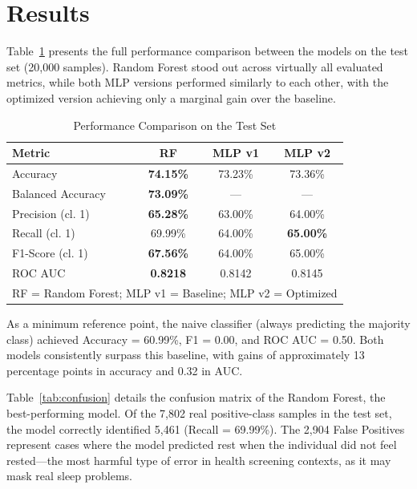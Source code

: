 \documentclass[conference]{IEEEtran}
\begin{document}
\section{Results}

Table~\ref{tab:results_main} presents the full performance comparison between the models on the test set (20,000 samples). Random Forest stood out across virtually all evaluated metrics, while both MLP versions performed similarly to each other, with the optimized version achieving only a marginal gain over the baseline.

\begin{table}[!ht]
\caption{Performance Comparison on the Test Set}
\label{tab:results_main}
\centering
\renewcommand{\arraystretch}{1.3}
\begin{tabular}{lccc}
\toprule
\textbf{Metric} & \textbf{RF} & \textbf{MLP v1} & \textbf{MLP v2} \\
\midrule
Accuracy            & \textbf{74.15\%} & 73.23\% & 73.36\% \\
Balanced Accuracy   & \textbf{73.09\%} & ---     & ---     \\
Precision (cl. 1)   & \textbf{65.28\%} & 63.00\% & 64.00\% \\
Recall (cl. 1)      & 69.99\%          & 64.00\% & \textbf{65.00\%} \\
F1-Score (cl. 1)    & \textbf{67.56\%} & 64.00\% & 65.00\% \\
ROC AUC             & \textbf{0.8218}  & 0.8142  & 0.8145  \\
\bottomrule
\multicolumn{4}{l}{\footnotesize RF = Random Forest; MLP v1 = Baseline; MLP v2 = Optimized} \\
\end{tabular}
\end{table}

As a minimum reference point, the naive classifier (always predicting the majority class) achieved Accuracy = 60.99\%, F1 = 0.00, and ROC AUC = 0.50. Both models consistently surpass this baseline, with gains of approximately 13 percentage points in accuracy and 0.32 in AUC.

Table~\ref{tab:confusion} details the confusion matrix of the Random Forest, the best-performing model. Of the 7,802 real positive-class samples in the test set, the model correctly identified 5,461 (Recall = 69.99\%). The 2,904 False Positives represent cases where the model predicted rest when the individual did not feel rested---the most harmful type of error in health screening contexts, as it may mask real sleep problems.
\end{document}
